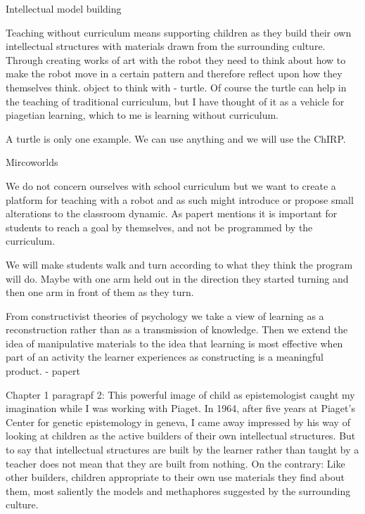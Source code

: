 Intellectual model building

Teaching without curriculum means supporting children as they build their own intellectual structures with materials drawn from the surrounding culture. Through creating works of art with the robot they need to think about how to make the robot move in a certain pattern and therefore reflect upon how they themselves think. object to think with - turtle. Of course the turtle can help in the teaching of traditional curriculum, but I have thought of it as a vehicle for piagetian learning, which to me is learning without curriculum.


A turtle is only one example. We can use anything and we will use the ChIRP.


Mircoworlds

We do not concern ourselves with school curriculum but we want to create a platform for teaching with a robot and as such might introduce or propose small alterations to the classroom dynamic. As papert mentions it is important for students to reach a goal by themselves, and not be programmed by the curriculum.

We will make students walk and turn according to what they think the program will do. Maybe with one arm held out in the direction they started turning and then one arm in front of them as they turn.

From constructivist theories of psychology we take a view of learning as a reconstruction rather than as a transmission of knowledge. Then we extend the idea of manipulative materials to the idea that learning is most effective when part of an activity the learner experiences as constructing is a meaningful product.  - papert

Chapter 1 paragrapf 2:
This powerful image of child as epistemologist caught my imagination while I was working with Piaget. In 1964, after five years at Piaget's Center for genetic epistemology in geneva, I came away impressed by his way of looking at children as the active builders of their own intellectual structures. But to say that intellectual structures are built by the learner rather than taught by a teacher does not mean that they are built from nothing. On the contrary: Like other builders, children appropriate to their own use materials they find about them, most saliently the models and methaphores suggested by the surrounding culture. 